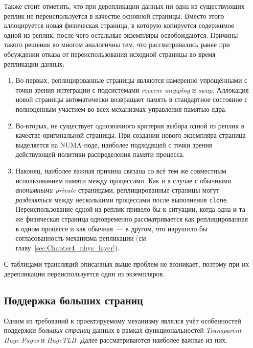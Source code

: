Также стоит отметить, что при дерепликации данных ни одна из существующих реплик не переиспользуется в качестве основной страницы. Вместо этого аллоцируется новая физическая страница, в которую копируется содержимое одной из реплик, после чего остальные экземпляры освобождаются. Причины такого решения во многом аналогичны тем, что рассматривались ранее при обсуждении отказа от переиспользования исходной страницы во время репликации данных:
\begin{enumerate}
    \item Во-первых, реплицированные страницы являются намеренно упрощёнными с точки зрения интеграции с подсистемами \textit{reverse mapping} и \textit{swap}. Аллокация новой страницы автоматически возвращает память в стандартное состояние с полноценным участием во всех механизмах управления памятью ядра.

    \item Во-вторых, не существует однозначного критерия выбора одной из реплик в качестве оригинальной страницы. При создании нового экземпляра страница выделяется на NUMA-ноде, наиболее подходящей с точки зрения действующей политики распределения памяти процесса.

    \item Наконец, наиболее важная причина связана со всё тем же совместным использованием памяти между процессами. Как и в случае с обычными \textit{анонимными private} страницами, реплицированные страницы могут \textit{разделяться} между несколькими процессами после выполнения \texttt{clone}. Переиспользование одной из реплик привело бы к ситуации, когда одна и та же физическая страница одновременно рассматривается как реплицированная в одном процессе и как обычная~--- в другом, что нарушило бы согласованность механизма репликации (см главу~\ref{sec:Chapter4_phys_layer}).
\end{enumerate}

С таблицами трансляций описанных выше проблем не возникает, поэтому при их дерепликации переиспользуется один из экземпляров.

\subsection{Поддержка больших страниц}
\label{sec:Chapter3_huge_pages}

Одним из требований к проектируемому механизму являлся учёт особенностей поддержки \textit{больших страниц} данных в рамках функциональностей \textit{Transparent Huge Pages}\cite{THP} и \textit{HugeTLB}\cite{hugetlb}. Далее рассматриваются наиболее важные из них.

